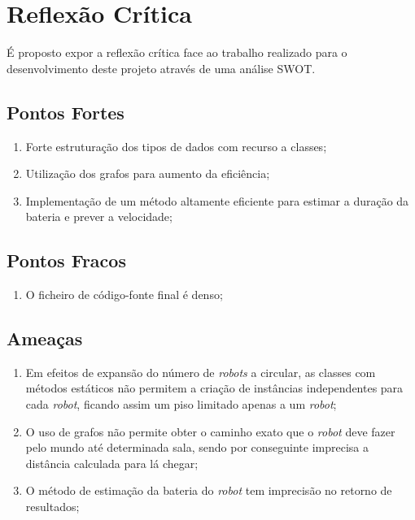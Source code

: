 \section{Reflexão Crítica}
\label{sec::reflexao:critica}

É proposto expor a reflexão crítica face ao trabalho realizado para o desenvolvimento deste projeto através de uma análise \ac{SWOT}.

\subsection{Pontos Fortes}
\label{ssec::reflexao:critica:fortes}

\begin{enumerate}
	\item Forte estruturação dos tipos de dados com recurso a classes;
	\item Utilização dos grafos para aumento da eficiência;
	\item Implementação de um método altamente eficiente para estimar a duração da bateria e prever a velocidade;
\end{enumerate}


\subsection{Pontos Fracos}
\label{ssec::reflexao:critica:fracos}

\begin{enumerate}
	\item O ficheiro de código-fonte final é denso;
\end{enumerate}


\subsection{Ameaças}
\label{ssec::reflexao:critica:ameacas}

\begin{enumerate}
	\item Em efeitos de expansão do número de \emph{robots} a circular, as classes com métodos estáticos não permitem a criação de instâncias independentes para cada \emph{robot}, ficando assim um piso limitado apenas a um \emph{robot};
	\item O uso de grafos não permite obter o caminho exato que o \emph{robot} deve fazer pelo mundo até determinada sala, sendo por conseguinte imprecisa a distância calculada para lá chegar;
	\item O método de estimação da bateria do \emph{robot} tem imprecisão no retorno de resultados;
\end{enumerate}

